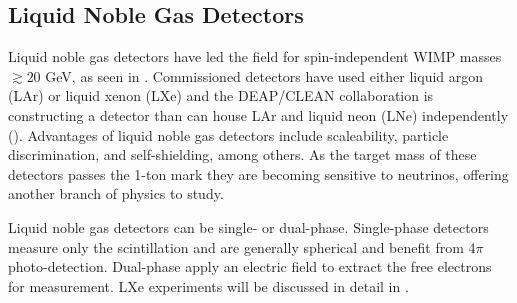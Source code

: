 \subsection{Liquid Noble Gas Detectors} \label{subsec:noble_gas}
Liquid noble gas detectors have led the field for spin-independent WIMP masses $\gtrsim 20$ GeV, as seen in
.  Commissioned detectors have
used either liquid argon (LAr) or liquid xenon (LXe) and the DEAP/CLEAN collaboration is constructing a detector than can house
LAr and liquid neon (LNe) independently ().  Advantages of liquid noble gas detectors
include scaleability, particle discrimination, and self-shielding, among others.  As the target mass of these detectors passes
the 1-ton mark they are becoming sensitive to neutrinos, offering another branch of physics to study.

Liquid noble gas detectors can be single- or dual-phase.  Single-phase detectors measure only the scintillation and are generally
spherical and benefit from 4$\pi$ photo-detection.  Dual-phase apply an electric field to extract the free electrons for
measurement.  LXe experiments will be discussed in detail in .


